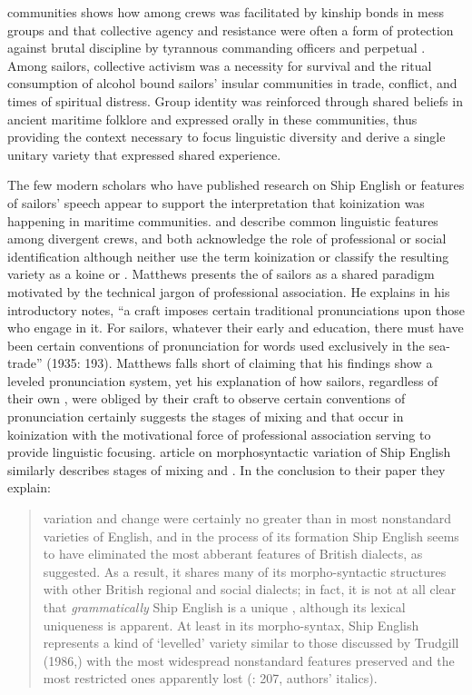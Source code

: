 communities shows how  among crews was facilitated by kinship bonds in mess groups and that collective agency and resistance were often a form of protection against brutal discipline by tyrannous commanding officers and perpetual . Among sailors, collective activism was a necessity for survival and the ritual consumption of alcohol bound sailors’ insular communities in trade, conflict, and times of spiritual distress. Group identity was reinforced through shared beliefs in ancient maritime folklore and expressed orally in these communities, thus providing the context necessary to focus linguistic diversity and derive a single unitary variety that expressed shared experience. 


The few modern scholars who have published research on Ship English or features of sailors’ speech appear to support the interpretation that koinization was happening in maritime communities. \citet{Matthews1935} and \citet{BaileyRoss1988} describe common linguistic features among divergent crews, and both acknowledge the role of professional or social identification although neither use the term koinization or classify the resulting variety as a koine or . Matthews presents the  of sailors as a shared paradigm motivated by the technical jargon of professional association. He explains in his introductory notes, “a craft imposes certain traditional pronunciations upon those who engage in it. For sailors, whatever their early  and education, there must have been certain conventions of pronunciation for words used exclusively in the sea-trade” (1935: 193). Matthews falls short of claiming that his findings show a leveled pronunciation system, yet his explanation of how sailors, regardless of their own , were obliged by their craft to observe certain conventions of pronunciation certainly suggests the stages of mixing and  that occur in koinization with the motivational force of professional association serving to provide linguistic focusing.  article on morphosyntactic variation of Ship English similarly describes stages of mixing and . In the conclusion to their paper they explain: 


\begin{quotation}
variation and change were certainly no greater than in most nonstandard varieties of English, and in the process of its formation Ship English seems to have eliminated the most abberant features of British dialects, as \citet{Hancock1976} suggested. As a result, it shares many of its morpho-syntactic structures with other British regional and social dialects; in fact, it is not at all clear that \textit{grammatically} Ship English is a unique , although its lexical uniqueness is apparent. At least in its morpho-syntax, Ship English represents a kind of ‘levelled’ variety similar to those discussed by Trudgill (1986,) with the most widespread nonstandard features preserved and the most restricted ones apparently lost (\citealt{BaileyRoss1988}: 207, authors’ italics). 
\end{quotation}

